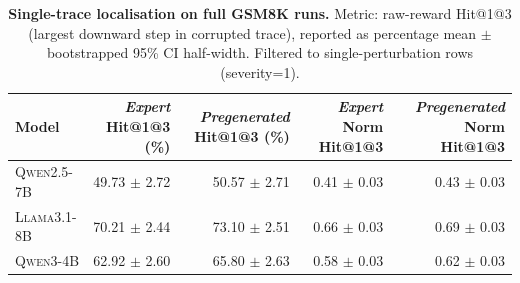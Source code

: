 \begin{table}[t]
\centering
\small
\renewcommand{\arraystretch}{1.08}
\begin{tabular}{l r r r r}
\toprule
\textbf{Model} & \textbf{\textit{Expert} Hit@1@3 (\%)} & \textbf{\textit{Pregenerated} Hit@1@3 (\%)} & \textbf{\textit{Expert} Norm Hit@1@3} & \textbf{\textit{Pregenerated} Norm Hit@1@3} \\
\midrule
\textsc{Qwen2.5-7B} & 49.73 $\pm$ 2.72 & 50.57 $\pm$ 2.71 & 0.41 $\pm$ 0.03 & 0.43 $\pm$ 0.03 \\
\textsc{Llama3.1-8B} & 70.21 $\pm$ 2.44 & 73.10 $\pm$ 2.51 & 0.66 $\pm$ 0.03 & 0.69 $\pm$ 0.03 \\
\textsc{Qwen3-4B} & 62.92 $\pm$ 2.60 & 65.80 $\pm$ 2.63 & 0.58 $\pm$ 0.03 & 0.62 $\pm$ 0.03 \\
\bottomrule
\end{tabular}
\caption{\textbf{Single-trace localisation on full GSM8K runs.} Metric: raw-reward Hit@1@3 (largest downward step in corrupted trace), reported as percentage mean $\pm$ bootstrapped 95\% CI half-width.  Filtered to single-perturbation rows (severity=1).}
\label{tab:localisation_hit1at3_full_raw}
\end{table}